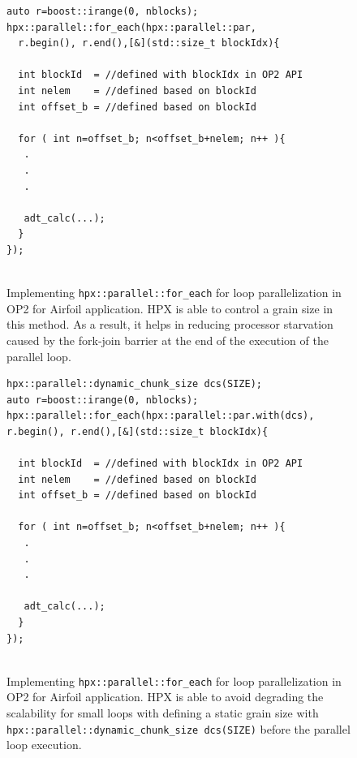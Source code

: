 \documentclass[conference]{IEEEtran}
\begin{document}
\begin{figure} 
    \begin{lstlisting}    
auto r=boost::irange(0, nblocks);
hpx::parallel::for_each(hpx::parallel::par,
  r.begin(), r.end(),[&](std::size_t blockIdx){
  
  int blockId  = //defined with blockIdx in OP2 API
  int nelem    = //defined based on blockId 
  int offset_b = //defined based on blockId
        
  for ( int n=offset_b; n<offset_b+nelem; n++ ){
   .
   .
   .

   adt_calc(...);
  }
});
  
    \end{lstlisting}
    \caption{\small{Implementing \texttt{hpx::parallel::for\_each} for loop parallelization in OP2 for Airfoil application. HPX is able to control a grain size in this method. As a result, it helps in reducing processor starvation caused by the fork-join barrier at the end of the execution of the parallel loop.}}
    \label{l3}
\end{figure}

\begin{figure} 
    \begin{lstlisting}    
hpx::parallel::dynamic_chunk_size dcs(SIZE);
auto r=boost::irange(0, nblocks);
hpx::parallel::for_each(hpx::parallel::par.with(dcs), r.begin(), r.end(),[&](std::size_t blockIdx){
  
  int blockId  = //defined with blockIdx in OP2 API
  int nelem    = //defined based on blockId 
  int offset_b = //defined based on blockId
        
  for ( int n=offset_b; n<offset_b+nelem; n++ ){
   .
   .
   .

   adt_calc(...);
  }
});
  
    \end{lstlisting}
    \caption{\small{Implementing \texttt{hpx::parallel::for\_each} for loop parallelization in OP2 for Airfoil application. HPX is able to avoid degrading the scalability for small loops with defining a static grain size with \texttt{hpx::parallel::dynamic\_chunk\_size dcs(SIZE)} before the parallel loop execution.}}
    \label{l3b}
\end{figure}
\end{document}
